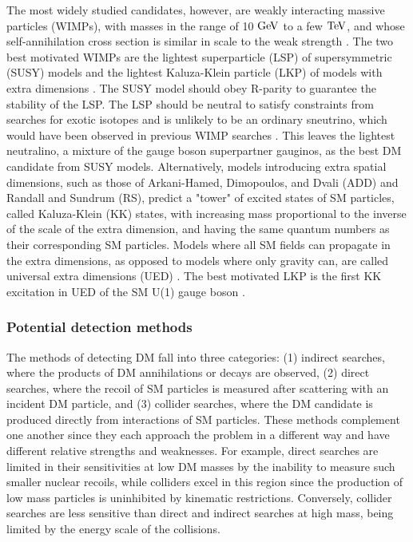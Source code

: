 \indent The most widely studied candidates, however, are weakly interacting massive particles (WIMPs), with masses in the range of 10 $\mathrm{Ge\kern -0.1em V}$ to a few $\mathrm{Te\kern -0.1em V}$, and whose self-annihilation cross section is similar in scale to the weak strength \cite{Bertone:2004pz}. The two best motivated WIMPs are the lightest superparticle (LSP) of supersymmetric (SUSY) models \cite{Jungman:1995df} and the lightest Kaluza-Klein particle (LKP) of models with extra dimensions \cite{Kolb:1983fm}. The SUSY model should obey R-parity to guarantee the stability of the LSP. The LSP should be neutral to satisfy constraints from searches for exotic isotopes and is unlikely to be an ordinary sneutrino, which would have been observed in previous WIMP searches \cite{Agashe:2014kda}. This leaves the lightest neutralino, a mixture of the gauge boson superpartner gauginos, as the best DM candidate from SUSY models. Alternatively, models introducing extra spatial dimensions, such as those of Arkani-Hamed, Dimopoulos, and Dvali (ADD) \cite{ArkaniHamed:1998rs} and Randall and Sundrum (RS)\cite{Randall:1999ee}, predict a "tower" of excited states of SM particles, called Kaluza-Klein (KK) states, with increasing mass proportional to the inverse of the scale of the extra dimension, and having the same quantum numbers as their corresponding SM particles. Models where all SM fields can propagate in the extra dimensions, as opposed to models where only gravity can, are called universal extra dimensions (UED) \cite{Appelquist:2000nn}. The best motivated LKP is the first KK excitation in UED of the SM U(1) gauge boson \cite{Cheng:2002iz}. 

\subsubsection{Potential detection methods}

The methods of detecting DM fall into three categories: (1) indirect searches, where the products of DM annihilations or decays are observed, (2) direct searches, where the recoil of SM particles is measured after scattering with an incident DM particle, and (3) collider searches, where the DM candidate is produced directly from interactions of SM particles. These methods complement one another since they each approach the problem in a different way and have different relative strengths and weaknesses. For example, direct searches are limited in their sensitivities at low DM masses by the inability to measure such smaller nuclear recoils, while colliders excel in this region since the production of low mass particles is uninhibited by kinematic restrictions. Conversely, collider searches are less sensitive than direct and indirect searches at high mass, being limited by the energy scale of the collisions.

